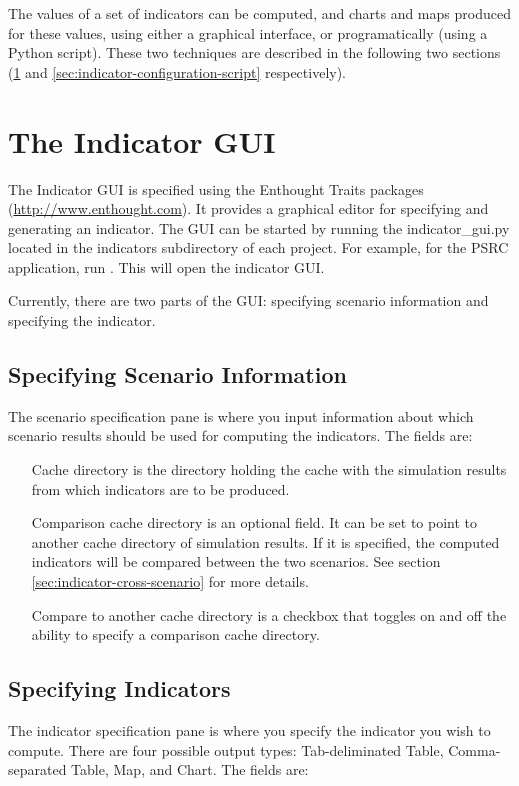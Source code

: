 The values of a set of indicators \indicatorsindex can be computed,
and charts and maps produced for these values, using either a
graphical interface, or programatically (using a Python script).
These two techniques are described in the following two sections
(\ref{sec:indicator-configuration-gui} and
\ref{sec:indicator-configuration-script} respectively).  

\section{The Indicator GUI}
\label{sec:indicator-configuration-gui}

The Indicator GUI is specified using the Enthought Traits packages
(\url{http://www.enthought.com}).  It provides a graphical editor for
specifying and generating an indicator.  The GUI can be started by running
the indicator_gui.py located in the indicators subdirectory of each
project. For example, for the PSRC application, run
.  This will open the indicator GUI.

Currently, there are two parts of the GUI: specifying scenario information and 
specifying the indicator. 

\subsection{Specifying Scenario Information}
The scenario specification pane is where you input information 
about which scenario results should be used for computing the indicators. 
The fields are:
\begin{itemize}
\tight
\item[Cache directory] is the directory holding the cache with the
  simulation results from which indicators are to be produced.

\item[Comparison cache directory] is an optional field. It can 
be set to point to another cache directory of simulation results.
If it is specified, the computed indicators will be compared 
between the two scenarios. See section \ref{sec:indicator-cross-scenario} 
for more details. 

\item[Compare to another cache directory] is a checkbox that toggles
on and off the ability to specify a comparison cache directory.

\end{itemize}

\subsection{Specifying Indicators}
The indicator specification pane is where you specify the 
indicator you wish to compute. There are four possible output 
types: Tab-deliminated Table, Comma-separated Table, Map, and 
Chart. The fields are:

